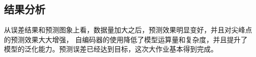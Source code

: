 \documentclass[UTF-8, 10pt]{ctexart}
\begin{document}
                \subsection{结果分析}从误差结果和预测图象上看，数据量加大之后，预测效果明显变好，并且对尖峰点的预测效果大大增强，
                自编码器的使用降低了模型运算量和复杂度，并且提升了模型的泛化能力。预测误差已经达到目标，这次大作业基本得到完成。\\

    
\end{document}
